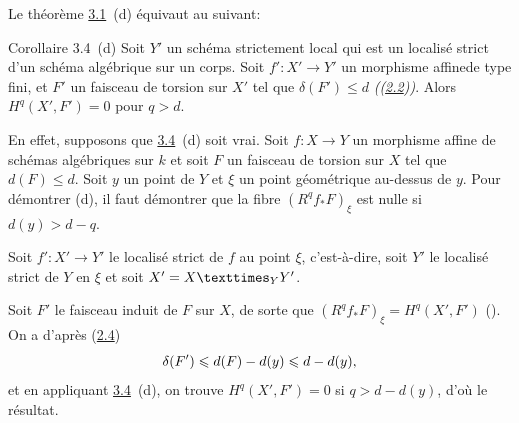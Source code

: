 \documentclass[10pt]{../fichiers-configuration-latex/smfart}
\begin{document}
Le théorème \hyperref[XIV.thm3.1]{3.1}~(d) équivaut
 au suivant:

\begin{enonce*}{Corollaire 3.4~(d)}
Soit $Y'$ un schéma strictement local qui est un localisé strict d'un
schéma algébrique sur un corps. Soit $f':X'\rightarrow Y'$ un
morphisme affine\pageoriginale de type fini, et $F'$ un faisceau de
torsion sur $X'$ tel que $\delta(F')\leq d$ \emph{(\cf (\hyperref[XIV.def2.2]{2.2}))}. Alors
$H^{q}(X',F')=0$ pour $q>d$.
\end{enonce*}

En effet, supposons que \hyperref[XIV.cor3.4]{3.4}~(d) soit vrai. Soit $f:X\rightarrow Y$ un
morphisme affine de schémas algébriques sur $k$ et soit $F$ un
faisceau de torsion sur $X$ tel que $d(F)\leq d$. Soit $y$ un point de
$Y$ et $\xi$ un point géométrique au-dessus de $y$. Pour démontrer 
 (d), 
il faut démontrer que la fibre $(R^{q}f_{\ast}F)_{\xi}$ est nulle
si $d(y)>d-q$.

Soit $f':X'\rightarrow Y'$ le localisé strict de $f$ au point $\xi$,
c'est-à-dire, soit $Y'$ le localisé strict de $Y$ en $\xi$ et soit
$X'=\fprod{X}{Y'}{Y}$.

Soit $F'$ le faisceau induit de $F$ sur $X$, de sorte que
$(R^{q}f_{\ast}F)_{\xi}=H^{q}(X',F')$ (). 
{On a d'après (\hyperref[XIV.prop2.4]{2.4})
$$
\delta(F')\leqslant d(F)-d(y)\leqslant d-d(y){},
$$}
et en appliquant \hyperref[XIV.cor3.4]{3.4}~(d), on trouve $H^{q}(X',F')=0$ si $q>d-d(y)$,
d'où le résultat.
\end{document}
